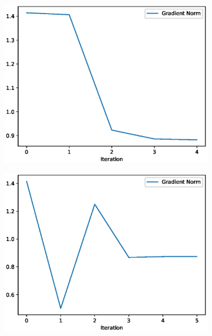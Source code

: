 \begin{figure}[h!]
\centering
\begin{subfigure}[t]{0.4\textwidth}
\centering
    \includegraphics[width=\textwidth]{images/python/pe-pE.eps}
\caption{}
\label{fig:Class distribution}
\end{subfigure}
\hfill 
\begin{subfigure}[t]{0.4\textwidth}
\centering
    \includegraphics[width=\textwidth]{images/python/al-pE-ag.eps}
    \caption{}
    \label{fig:TSNE}
\end{subfigure}
\hfill
\begin{subfigure}[t]{0.4\textwidth}
\centering

\end{subfigure}
\end{figure}
